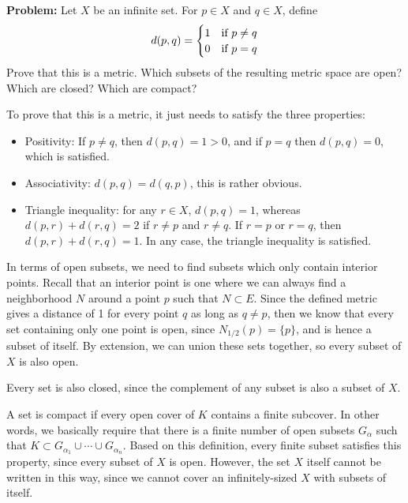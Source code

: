 \documentclass[10pt]{article}
\newenvironment{problem}{\textbf{Problem:}}{}
\begin{document}
	\begin{problem}
		Let \( X \) be an infinite set. For \( p \in X \) and \( q \in X \), define
		 \[
		 d(p, q) = \begin{cases}
			 1 & \text{if \( p \neq q \)}\\
			 0 & \text{if \( p = q \)}
		 \end{cases}
		 \] 
		 Prove that this is a metric. Which subsets of the resulting metric space are open? Which are closed? 
		 Which are compact? 
	\end{problem}

	\begin{solution}
		To prove that this is a metric, it just needs to satisfy the three properties:
		\begin{itemize}
			\item Positivity: If \( p \neq q \), then \( d(p, q) = 1 > 0 \), and if \( p = q \) then
				\( d(p, q) = 0 \), which is satisfied. 
			\item Associativity: \( d(p, q) = d(q, p) \), this is rather obvious. 
			\item Triangle inequality: for any \( r \in X \), \( d(p, q) = 1 \), whereas \( d(p, r) + d(r, q) = 2 \) 
				if \( r \neq p \) and \( r \neq q \). If  \( r = p \) or \( r = q \), then 
				\( d(p, r) + d(r,q) = 1 \). In any case, the triangle inequality is satisfied. 
		\end{itemize}
		In terms of open subsets, we need to find subsets which only contain interior points. Recall that an 
		interior point is one where we can always find a neighborhood \( N \) around a point \( p \) such that 
		\( N \subset E \). Since the defined metric gives a distance of 1 for every point \( q  \) as long as 
		\( q \neq p \), then we know that every set containing only one point is open, since  \( N_{1/2}(p) = \{p\} \),
		and is hence a subset of itself. By extension, we can union these sets together, so every subset
		of \( X \) is also open. 

		Every set is also closed, since the complement of any subset is also a subset of \( X \).     

		A set is compact if every open cover of \( K \) contains a finite subcover. In other words, we basically 
		require that there is a finite number of open subsets \( G_\alpha \) such that 
		\( K \subset G_{\alpha_1} \cup \cdots \cup G_{\alpha_n} \). Based on this definition, every finite 
		subset satisfies this property, since every subset of \( X \) is open. However, the set \( X \) itself
		cannot be written in this way, since we cannot cover an infinitely-sized \( X \) with subsets of itself.  
	\end{solution}
\end{document}
